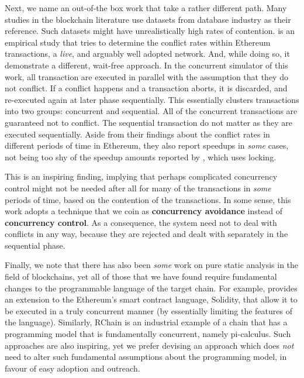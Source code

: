 Next, we name an out-of-the box work that take a rather different path. Many studies in the
blockchain literature use datasets from database industry as their reference. Such datasets might
have unrealistically high rates of contention. \cite{saraphEmpiricalStudySpeculative2019} is an empirical
study that tries to determine the conflict rates within Ethereum transactions, a \textit{live}, and
arguably well adopted network. And, while doing so, it demonstrate a different, wait-free approach.
In the concurrent simulator of this work, all transaction are executed in parallel with the
assumption that they do not conflict. If a conflict happens and a transaction aborts, it is
discarded, and re-executed again at later phase sequentially. This essentially clusters transactions
into two groups: concurrent and sequential. All of the concurrent transactions are guaranteed not to
conflict. The sequential transaction do not matter as they are executed sequentially. Aside from
their findings about the conflict rates in different periods of time in Ethereum, they also report
speedups in \textit{some} cases, not being too shy of the speedup amounts reported by
\cite{dickersonSmartLocksAddingConcurrency2017}, which uses locking.

This is an inspiring finding, implying that perhaps complicated concurrency control might not be
needed after all for many of the transactions in \textit{some} periods of time, based on the
contention of the transactions. In some sense, this work adopts a technique that we coin as
\textbf{concurrency avoidance} instead of \textbf{concurrency control}. As a consequence, the system
need not to deal with conflicts in any way, because they are rejected and dealt with separately in
the sequential phase.

Finally, we note that there has also been \textit{some} work on pure static analysis in the field of
blockchains, yet all of those that we have found require fundamental changes to the programmable
language of the target chain. For example, \cite{bartolettiStaticTrueConcurrent2019} provides an
extension to the Ethereum's smart contract language, Solidity, that allow it to be executed in a
truly concurrent manner (by essentially limiting the features of the language). Similarly, RChain is
an industrial example of a chain that has a programming model that is fundamentally
concurrent\cite{darrylRCast21Currency2019}, namely
pi-calculus\cite{turnerPolymorphicPiCalculusTheory1996}. Such approaches are also inspiring, yet we
prefer devising an approach which does \textit{not} need to alter such fundamental assumptions about
the programming model, in favour of easy adoption and outreach.


